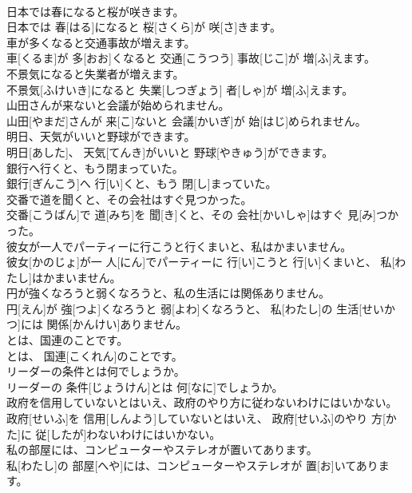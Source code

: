 \documentclass[8pt]{extreport}
\begin{document}
\begin{CJK}{UTF8}{min}
\\	日本では春になると桜が咲きます。	
\\	日本では 春[はる]になると 桜[さくら]が 咲[さ]きます。	
\\	車が多くなると交通事故が増えます。	
\\	車[くるま]が 多[おお]くなると 交通[こうつう] 事故[じこ]が 増[ふ]えます。	
\\	不景気になると失業者が増えます。	
\\	不景気[ふけいき]になると 失業[しつぎょう] 者[しゃ]が 増[ふ]えます。	
\\	山田さんが来ないと会議が始められません。	
\\	山田[やまだ]さんが 来[こ]ないと 会議[かいぎ]が 始[はじ]められません。	
\\	明日、天気がいいと野球ができます。	
\\	明日[あした]、 天気[てんき]がいいと 野球[やきゅう]ができます。	
\\	銀行へ行くと、もう閉まっていた。	
\\	銀行[ぎんこう]へ 行[い]くと、もう 閉[し]まっていた。	
\\	交番で道を聞くと、その会社はすぐ見つかった。	
\\	交番[こうばん]で 道[みち]を 聞[き]くと、その 会社[かいしゃ]はすぐ 見[み]つかった。	
\\	彼女が一人でパーティーに行こうと行くまいと、私はかまいません。	
\\	彼女[かのじょ]が一 人[にん]でパーティーに 行[い]こうと 行[い]くまいと、 私[わたし]はかまいません。	
\\	円が強くなろうと弱くなろうと、私の生活には関係ありません。	
\\	円[えん]が 強[つよ]くなろうと 弱[よわ]くなろうと、 私[わたし]の 生活[せいかつ]には 関係[かんけい]ありません。	
\\	とは、国連のことです。	
\\	とは、 国連[こくれん]のことです。	
\\	リーダーの条件とは何でしょうか。	
\\	リーダーの 条件[じょうけん]とは 何[なに]でしょうか。	
\\	政府を信用していないとはいえ、政府のやり方に従わないわけにはいかない。	
\\	政府[せいふ]を 信用[しんよう]していないとはいえ、 政府[せいふ]のやり 方[かた]に 従[したが]わないわけにはいかない。	
\\	私の部屋には、コンピューターやステレオが置いてあります。	
\\	私[わたし]の 部屋[へや]には、コンピューターやステレオが 置[お]いてあります。	

\end{CJK}
\end{document}
